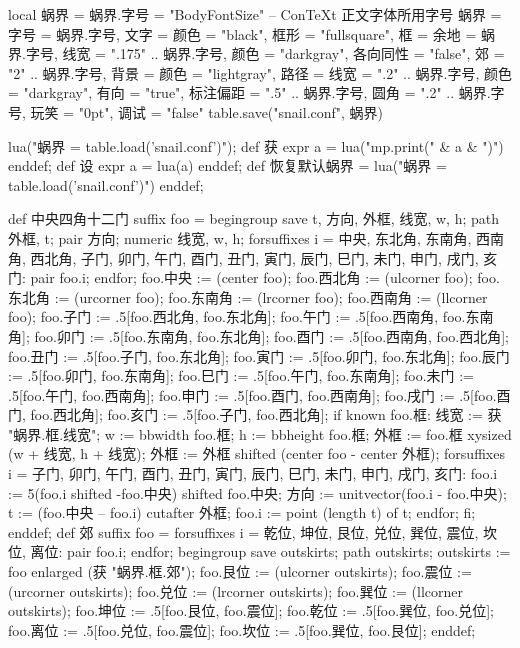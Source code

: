 \startluacode
local 蜗界 = {}
蜗界.字号 = "BodyFontSize" -- ConTeXt 正文字体所用字号
蜗界 = {
    字号 = 蜗界.字号,
    文字 = {颜色 = "black"},
    框形 = "fullsquare",
    框 = {余地 = 蜗界.字号,
          线宽 = ".175" .. 蜗界.字号,
          颜色 = "darkgray",
          各向同性 = "false",
          郊 = "2" .. 蜗界.字号},
    背景 = {颜色 = "lightgray"},
    路径 = {线宽 = ".2" .. 蜗界.字号,
            颜色 = "darkgray",
            有向 = "true",
            标注偏距 = ".5" .. 蜗界.字号,
            圆角 = ".2" .. 蜗界.字号},
    玩笑 = "0pt",
    调试 = "false"
}
table.save("snail.conf", 蜗界)
\stopluacode

\startMPinclusions
lua("蜗界 = table.load('snail.conf')");
def 获 expr a = lua("mp.print(" & a & ")") enddef;
def 设 expr a = lua(a) enddef;
def 恢复默认蜗界 =
  lua("蜗界 = table.load('snail.conf')")
enddef;
\stopMPinclusions

\startMPinclusions[+]
def 中央四角十二门 suffix foo = 
  begingroup
  save t, 方向, 外框, 线宽, w, h; path 外框, t; pair 方向; numeric 线宽, w, h;
  forsuffixes i = 中央, 东北角, 东南角, 西南角, 西北角,
                  子门, 卯门, 午门, 酉门,
                  丑门, 寅门, 辰门, 巳门, 未门, 申门, 戌门, 亥门:
    pair foo.i;
  endfor;
  foo.中央 := (center foo);
  foo.西北角 := (ulcorner foo); 
  foo.东北角 := (urcorner foo);
  foo.东南角 := (lrcorner foo);
  foo.西南角 := (llcorner foo);
  foo.子门 := .5[foo.西北角, foo.东北角];
  foo.午门 := .5[foo.西南角, foo.东南角];
  foo.卯门 := .5[foo.东南角, foo.东北角];
  foo.酉门 := .5[foo.西南角, foo.西北角];
  foo.丑门 := .5[foo.子门, foo.东北角];
  foo.寅门 := .5[foo.卯门, foo.东北角];
  foo.辰门 := .5[foo.卯门, foo.东南角];
  foo.巳门 := .5[foo.午门, foo.东南角];
  foo.未门 := .5[foo.午门, foo.西南角];
  foo.申门 := .5[foo.酉门, foo.西南角];
  foo.戌门 := .5[foo.酉门, foo.西北角];
  foo.亥门 := .5[foo.子门, foo.西北角];
  if known foo.框:
    线宽 := 获 "蜗界.框.线宽";
    w := bbwidth foo.框; h := bbheight foo.框;
    外框 := foo.框 xysized (w + 线宽, h + 线宽);
    外框 := 外框 shifted (center foo - center 外框);
    forsuffixes i = 子门, 卯门, 午门, 酉门,
                    丑门, 寅门, 辰门, 巳门, 未门, 申门, 戌门, 亥门:
      foo.i := 5(foo.i shifted -foo.中央) shifted foo.中央;
      方向 := unitvector(foo.i - foo.中央);
      t := (foo.中央 -- foo.i) cutafter 外框;
      foo.i := point (length t) of t;
    endfor;
  fi;
enddef;
def 郊 suffix foo = 
  forsuffixes i = 乾位, 坤位, 艮位, 兑位, 巽位, 震位, 坎位, 离位:
    pair foo.i;
  endfor;
  begingroup
    save outskirts; path outskirts;
  outskirts := foo enlarged (获 "蜗界.框.郊");
  foo.艮位 := (ulcorner outskirts); 
  foo.震位 := (urcorner outskirts);
  foo.兑位 := (lrcorner outskirts);
  foo.巽位 := (llcorner outskirts);
  foo.坤位 := .5[foo.艮位, foo.震位];
  foo.乾位 := .5[foo.巽位, foo.兑位];
  foo.离位 := .5[foo.兑位, foo.震位];
  foo.坎位 := .5[foo.巽位, foo.艮位];
enddef;

